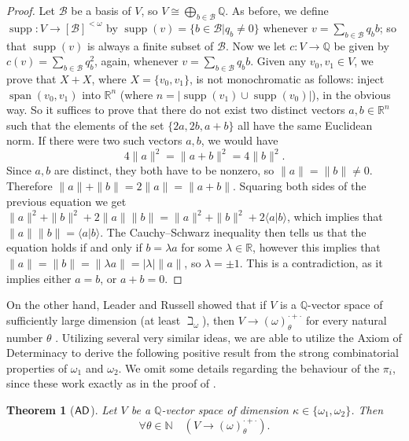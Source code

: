 \documentclass[10pt,a4paper]{amsart}
\newtheorem{theorem}{Theorem}[section]
\theoremstyle{definition}
\newcommand{\ad}{\mathnormal{\mathsf{AD}}}
\theoremstyle{remark}
\numberwithin{equation}{section}
\begin{document}
    \begin{proof}
        Let $\mathcal{B}$ be a basis of $V$, so $V\cong\bigoplus_{b\in\mathcal{B}}\mathbb{Q}$. As before, we define $\operatorname{supp}:V\to[\mathcal{B}]^{<\omega}$ by $\operatorname{supp}(v)=\{b\in\mathcal{B}|q_{b}\neq0\}$ whenever $v=\sum_{b\in\mathcal{B}}q_{b}b$; so that $\operatorname{supp}(v)$ is always a finite subset of $\mathcal B$. Now we let $c:V\to\mathbb{Q}$ be given by $c(v)=\sum_{b\in\mathcal{B}}q_{b}^2$, again, whenever $v=\sum_{b\in\mathcal{B}}q_{b}b$.
        Given any $v_{0},v_{1}\in V$, we prove that $X+X$, where $X=\{v_{0},v_{1}\}$, is not monochromatic as follows: inject $\operatorname{span}(v_0,v_1)$ into $\mathbb R^{n}$ (where $n=|\operatorname{supp}(v_1)\cup\operatorname{supp}(v_0)|$), in the obvious way. So it suffices to prove that there do not exist two distinct vectors $a,b\in\mathbb{R}^{n}$ such that the elements of the set $\{2a,2b,a+b\}$ all have the same Euclidean norm. If there were two such vectors $a,b$, we would have
        \begin{equation*}
            4\|a\|^{2}=\|a+b\|^{2}=4\|b\|^{2}.
        \end{equation*}
        Since $a,b$ are distinct, they both have to be nonzero, so $\|a\|=\|b\|\neq0$. Therefore $\|a\|+\|b\|=2\|a\|=\|a+b\|$.
        Squaring both sides of the previous equation we get $\|a\|^{2}+\|b\|^{2}+2\|a\|\|b\|=
        \|a\|^{2}+\|b\|^{2}+2\langle a|b\rangle$, which implies that $\|a\|\|b\|=\langle a|b\rangle$. The Cauchy--Schwarz inequality then tells us that the equation holds if and only if $b=\lambda a$ for some $\lambda\in\mathbb{R}$, however this implies that $\|a\|=\|b\|=\|\lambda a\|=|\lambda|\|a\|$, so $\lambda=\pm1$. This is a contradiction, as it implies either $a=b$, or $a+b=0$.
    \end{proof}

On the other hand, Leader and Russell showed that if $V$ is a $\mathbb{Q}$-vector space of sufficiently large dimension (at least $\beth_\omega$), then $V\to(\omega)^{\cdot+\cdot}_{\theta}$ for every natural number $\theta$ \cite[Theorem 2]{LeaderRussell2020}. 
Utilizing several very similar ideas, we are able to utilize the Axiom of Determinacy to derive the following positive result from the strong combinatorial properties of $\omega_1$ and $\omega_2$. We omit some details regarding the behaviour of the $\pi_i$, since these work exactly as in the proof of \cite[Theorem 2]{LeaderRussell2020}.


\begin{theorem}[$\ad$]\label{thm:owings-omega2}
Let $V$ be a $\mathbb{Q}$-vector space of dimension $\kappa\in\{\omega_1, \omega_2\}$. 
Then
\[
\forall\theta\in\mathbb{N}\quad(V\to(\omega)^{\cdot+\cdot}_{\theta}).
\]
\end{theorem}
\end{document}
